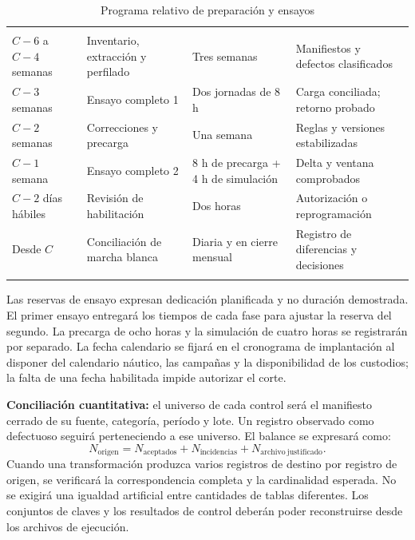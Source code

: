 \begingroup
\setlength{\tabcolsep}{3pt}
\begin{longtable}{@{}L{.17\textwidth}L{.34\textwidth}L{.21\textwidth}L{\dimexpr.28\textwidth-18pt\relax}@{}}
\caption{Programa relativo de preparación y ensayos}\label{tab:sd5_programa_ensayos}\\
\hline
{} &  &  &  \\ \hline
\endfirsthead
\hline
{} &  &  &  \\ \hline
\endhead
\(C-6\) a \(C-4\) semanas & Inventario, extracción y perfilado & Tres semanas & Manifiestos y defectos clasificados \\ \addlinespace \hline
\(C-3\) semanas & Ensayo completo 1 & Dos jornadas de 8 h & Carga conciliada; retorno probado \\ \addlinespace \hline
\(C-2\) semanas & Correcciones y precarga & Una semana & Reglas y versiones estabilizadas \\ \addlinespace \hline
\(C-1\) semana & Ensayo completo 2 & 8 h de precarga + 4 h de simulación & Delta y ventana comprobados \\ \addlinespace \hline
\(C-2\) días hábiles & Revisión de habilitación & Dos horas & Autorización o reprogramación \\ \addlinespace \hline
Desde \(C\) & Conciliación de marcha blanca & Diaria y en cierre mensual & Registro de diferencias y decisiones \\ \addlinespace \hline
\end{longtable}
\endgroup

Las reservas de ensayo expresan dedicación planificada y no duración demostrada. El primer ensayo entregará los tiempos de cada fase para ajustar la reserva del segundo. La precarga de ocho horas y la simulación de cuatro horas se registrarán por separado. La fecha calendario se fijará en el cronograma de implantación al disponer del calendario náutico, las campañas y la disponibilidad de los custodios; la falta de una fecha habilitada impide autorizar el corte.

\textbf{Conciliación cuantitativa:} el universo de cada control será el manifiesto cerrado de su fuente, categoría, período y lote. Un registro observado como defectuoso seguirá perteneciendo a ese universo. El balance se expresará como:
\[
N_{\mathrm{origen}} =
N_{\mathrm{aceptados}} + N_{\mathrm{incidencias}} +
N_{\mathrm{archivo\ justificado}}.
\]
Cuando una transformación produzca varios registros de destino por registro de origen, se verificará la correspondencia completa y la cardinalidad esperada. No se exigirá una igualdad artificial entre cantidades de tablas diferentes. Los conjuntos de claves y los resultados de control deberán poder reconstruirse desde los archivos de ejecución.

